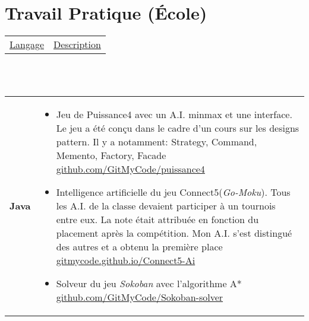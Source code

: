 \documentclass[a4paper,10pt]{extarticle}
\makeatletter
\newlength{\indicewidth}%
\newlength{\separatorcolumnwidth}%
\newlength{\maincolumnwidth}%
\newlength{\spacecvline}%
\newcommand{\cvdetailitem}[3][\spacecvline]{
\noindent\begin{tabular}
{@{}p{\indicewidth}@{\hspace{\separatorcolumnwidth}} p{\maincolumnwidth}@{}}
	\raggedright{\bf{#2}} &{ #3}%
\end{tabular}%
\vspace{-0.9em}\par\addvspace{#1}  }
\newcommand{\cvdetaillist}[3][.25em]{}
\renewcommand{\cvdetaillist}[3][.25em]{%
  \cvdetailitem[#1]{#2}{#3}}
\makeatother
\begin{document}
\clearpage














\section{Travail Pratique \small (École)}
\begin{tabular*}{\textwidth}{p{ }
						 	 p{ }} 
\centering\underline{Langage} &\centering\underline{Description}
\end{tabular*}\vspace{-1em}
\\\\

\cvdetaillist{Java}{
\begin{itemize}\setlength{\itemsep}{1pt}
  \setlength{\parskip}{5pt}
  \setlength{\parsep}{0pt}
\item Jeu de Puissance4 avec un A.I. minmax et une interface. Le jeu a été conçu dans le cadre d'un cours sur les designs pattern. Il y a notamment: Strategy, Command, Memento, Factory, Facade \small \href{https://github.com/GitMyCode/puissance4}{github.com/GitMyCode/puissance4}
\item Intelligence artificielle du jeu Connect5(\textit{Go-Moku}). Tous les A.I. de la classe devaient participer à un tournois entre eux. La note était attribuée en fonction du placement après la compétition. Mon A.I. s'est distingué des autres et a obtenu la première place   \small \href{http://gitmycode.github.io/Connect5-Ai/}{gitmycode.github.io/Connect5-Ai} 

\item Solveur du jeu \emph{Sokoban} avec l'algorithme A*  \small \href{https://github.com/GitMyCode/Sokoban-solver}{github.com/GitMyCode/Sokoban-solver}


\end{itemize}
}
\end{document}
